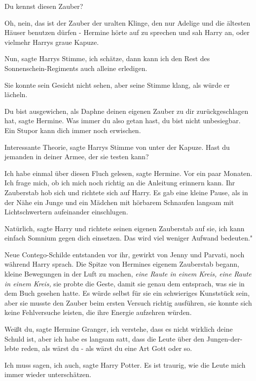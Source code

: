 \glqq Du kennst diesen Zauber?\grqq{}

\glqq Oh, nein, das ist der Zauber der uralten Klinge, den nur Adelige und die
ältesten Häuser benutzen dürfen -\grqq{} Hermine hörte auf zu sprechen und sah
Harry an, oder vielmehr Harrys graue Kapuze.

\glqq Nun\grqq{}, sagte Harrys Stimme, \glqq ich schätze, dann kann ich den Rest
des Sonnenschein-Regiments auch alleine erledigen.\grqq{}

Sie konnte sein Gesicht nicht sehen, aber seine Stimme klang, als würde er
lächeln.

\glqq Du bist ausgewichen, als Daphne deinen eigenen Zauber zu dir
zurückgeschlagen hat\grqq{}, sagte Hermine. \glqq Was immer du also getan hast,
du bist nicht unbesiegbar. Ein Stupor kann dich immer noch erwischen.\grqq{}

\glqq Interessante Theorie\grqq{}, sagte Harrys Stimme von unter der Kapuze.
\glqq Hast du jemanden in deiner Armee, der sie testen kann?\grqq{}

\glqq Ich habe einmal über diesen Fluch gelesen\grqq{}, sagte Hermine. \glqq Vor
ein paar Monaten. Ich frage mich, ob ich mich noch richtig an die Anleitung
erinnern kann.\grqq{} Ihr Zauberstab hob sich und richtete sich auf Harry. Es
gab eine kleine Pause, als in der Nähe ein Junge und ein Mädchen mit hörbarem
Schnaufen langsam mit Lichtschwertern aufeinander einschlugen.

\glqq Natürlich\grqq{}, sagte Harry und richtete seinen eigenen Zauberstab auf
sie, \glqq ich kann einfach Somnium gegen dich einsetzen. Das wird viel weniger
Aufwand bedeuten."

Neue Contego-Schilde entstanden vor ihr, gewirkt von Jenny und Parvati, noch
während Harry sprach. Die Spitze von Hermines eigenem Zauberstab begann, kleine
Bewegungen in der Luft zu machen, \emph{eine Raute in einem Kreis, eine Raute in
einem Kreis,} sie probte die Geste, damit sie genau dem entsprach, was sie in
dem Buch gesehen hatte. Es würde selbst für sie ein schwieriges Kunststück sein,
aber sie musste den Zauber beim ersten Versuch richtig ausführen, sie konnte
sich keine Fehlversuche leisten, die ihre Energie aufzehren würden.

\glqq Weißt du\grqq{}, sagte Hermine Granger, \glqq ich verstehe, dass es nicht
wirklich deine Schuld ist, aber ich habe es langsam satt, dass die Leute über
den Jungen-der-lebte reden, als wärst du - als wärst du eine Art Gott oder
so.\grqq{}

\glqq Ich muss sagen, ich auch\grqq{}, sagte Harry Potter. \glqq Es ist traurig,
wie die Leute mich immer wieder unterschätzen.\grqq{}

